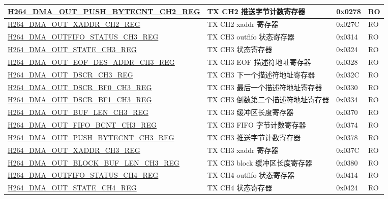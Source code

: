\begin{longtable}{ | p{7.5cm} | p{5.7cm} | p{1.2cm} | p{1cm} | }
    \hyperref[regdesc:H264DMAOUTPUSHBYTECNTCH2REG]{H264\_DMA\_OUT\_PUSH\_BYTECNT\_CH2\_REG} & TX CH2 推送字节计数寄存器 & 0x0278 & RO \\ \hline
    \hyperref[regdesc:H264DMAOUTXADDRCH2REG]{H264\_DMA\_OUT\_XADDR\_CH2\_REG} & TX CH2 xaddr 寄存器 & 0x027C & RO \\ \hline
    \hyperref[regdesc:H264DMAOUTFIFOSTATUSCH3REG]{H264\_DMA\_OUTFIFO\_STATUS\_CH3\_REG} & TX CH3 outfifo 状态寄存器 & 0x0314 & RO \\ \hline
    \hyperref[regdesc:H264DMAOUTSTATECH3REG]{H264\_DMA\_OUT\_STATE\_CH3\_REG} & TX CH3 状态寄存器 & 0x0324 & RO \\ \hline
    \hyperref[regdesc:H264DMAOUTEOFDESADDRCH3REG]{H264\_DMA\_OUT\_EOF\_DES\_ADDR\_CH3\_REG} & TX CH3 EOF 描述符地址寄存器 & 0x0328 & RO \\ \hline
    \hyperref[regdesc:H264DMAOUTDSCRCH3REG]{H264\_DMA\_OUT\_DSCR\_CH3\_REG} & TX CH3 下一个描述符地址寄存器 & 0x032C & RO \\ \hline
    \hyperref[regdesc:H264DMAOUTDSCRBF0CH3REG]{H264\_DMA\_OUT\_DSCR\_BF0\_CH3\_REG} & TX CH3 最后一个描述符地址寄存器 & 0x0330 & RO \\ \hline
    \hyperref[regdesc:H264DMAOUTDSCRBF1CH3REG]{H264\_DMA\_OUT\_DSCR\_BF1\_CH3\_REG} & TX CH3 倒数第二个描述符地址寄存器 & 0x0334 & RO \\ \hline
    \hyperref[regdesc:H264DMAOUTBUFLENCH3REG]{H264\_DMA\_OUT\_BUF\_LEN\_CH3\_REG} & TX CH3 缓冲区长度寄存器 & 0x0370 & RO \\ \hline
    \hyperref[regdesc:H264DMAOUTFIFOBCNTCH3REG]{H264\_DMA\_OUT\_FIFO\_BCNT\_CH3\_REG} & TX CH3 FIFO 字节计数寄存器 & 0x0374 & RO \\ \hline
    \hyperref[regdesc:H264DMAOUTPUSHBYTECNTCH3REG]{H264\_DMA\_OUT\_PUSH\_BYTECNT\_CH3\_REG} & TX CH3  推送字节计数寄存器 & 0x0378 & RO \\ \hline
    \hyperref[regdesc:H264DMAOUTXADDRCH3REG]{H264\_DMA\_OUT\_XADDR\_CH3\_REG} & TX CH3 xaddr 寄存器 & 0x037C & RO \\ \hline
    \hyperref[regdesc:H264DMAOUTBLOCKBUFLENCH3REG]{H264\_DMA\_OUT\_BLOCK\_BUF\_LEN\_CH3\_REG} & TX CH3 block 缓冲区长度寄存器 & 0x0380 & RO \\ \hline
    \hyperref[regdesc:H264DMAOUTFIFOSTATUSCH4REG]{H264\_DMA\_OUTFIFO\_STATUS\_CH4\_REG} & TX CH4 outfifo 状态寄存器 & 0x0414 & RO \\ \hline
    \hyperref[regdesc:H264DMAOUTSTATECH4REG]{H264\_DMA\_OUT\_STATE\_CH4\_REG} & TX CH4 状态寄存器 & 0x0424 & RO \\ \hline

\end{longtable}
